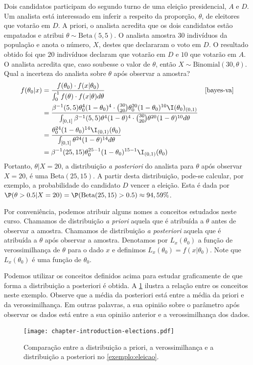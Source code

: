 \begin{example}
 \label{exemplo:eleicao}
 Dois candidatos participam do segundo turno de
 uma eleição presidencial, $A$ e $D$.
 Um analista está interessado em inferir a 
 respeito da proporção, $\theta$, de
 eleitores que votarão em $D$.
 A priori, o analista acredita que 
 os dois candidatos estão empatados e 
 atribui $\theta \sim \text{Beta}(5, 5)$.
 O analista amostra $30$ indivíduos da população e 
 anota o número, $X$, destes que 
 declararam o voto em $D$.
 O resultado obtido foi que 
 $20$ indivíduos declaram que votarão em $D$ e
 $10$ que votarão em $A$.
 O analista acredita que, 
 caso soubesse o valor de $\theta$,
 então $X \sim \text{Binomial}(30, \theta)$.
 Qual a incerteza do analista sobre 
 $\theta$ após observar a amostra?
 \begin{align*}
  f(\theta_{0}|x)	
  &= \frac{f(\theta_{0}) \cdot f(x|\theta_{0})}
  {\int_{0}^1{f(\theta) \cdot f(x|\theta)d\theta}}
  & \Cref{bayes-va}	\\
  &= \frac{\beta^{-1}(5,5)\theta_{0}^{4}(1-\theta_{0})^{4}
  \cdot {30 \choose 20}\theta_{0}^{20}(1-\theta_{0})^{10}\I(\theta_{0})_{(0,1)}}{\int_{[0,1]}{\beta^{-1}(5,5)\theta^{4}(1-\theta)^{4} \cdot {30 \choose 20}\theta^{20}(1-\theta)^{10}} d\theta} \\
  &= \frac{\theta_{0}^{24}(1-\theta_{0})^{14}\I_{(0,1)}(\theta_{0})}{\int_{[0,1]}\theta^{24}(1-\theta)^{14} d\theta} \\
  &= \beta^{-1}(25,15)\theta_{0}^{25-1}(1-\theta_{0})^{15-1}\I_{(0,1)}(\theta_{0})
 \end{align*}
 Portanto, $\theta|X=20$, a distribuição 
 \emph{a posteriori} do analista para 
 $\theta$ após observar $X=20$, é
 uma Beta$(25,15)$.
 A partir desta distribuição, pode-se calcular, por exemplo, a probabilidade do candidato $D$ vencer a eleição. Esta é dada por $\P(\theta>0.5|X=20)=\P(\mbox{Beta}(25,15)>0.5) \approx 94,59\%$.

 Por conveniência, podemos atribuir alguns 
 nomes a conceitos estudados neste curso.
 Chamamos de distribuição \emph{a priori} aquela que
 é atribuída a $\theta$ antes de observar a amostra.
 Chamamos de distribuição \emph{a posteriori} aquela que
 é atribuída a $\theta$ após observar a amostra.
 Denotamos por $L_{x}(\theta_{0})$ a
 função de verossimilhança de $\theta$ para
 o dado $x$ e definimos 
 $L_{x}(\theta_{0}) = f(x|\theta_{0})$.
 Note que $L_{x}(\theta_{0})$ é
 uma função de $\theta_{0}$.

 Podemos utilizar os conceitos definidos acima para
 estudar graficamente de que forma a
 distribuição a posteriori é obtida.
 A \cref{figura:eleicao} ilustra a
 relação entre os conceitos neste exemplo.
 Observe que a média da posteriori está entre
 a média da priori e da verossimilhança.
 Em outras palavras, a sua opinião sobre
 o parâmetro após observar os dados está entre
 a sua opinião anterior e a verossimilhança dos dados.
 \begin{figure}
  \centering
  \texttt{[image: chapter-introduction-elections.pdf]}
  \caption{Comparação entre a distribuição a priori,
  a verossimilhança e a distribuição a posteriori no
  \cref{exemplo:eleicao}.}
  \label{figura:eleicao}
 \end{figure}
\end{example}

